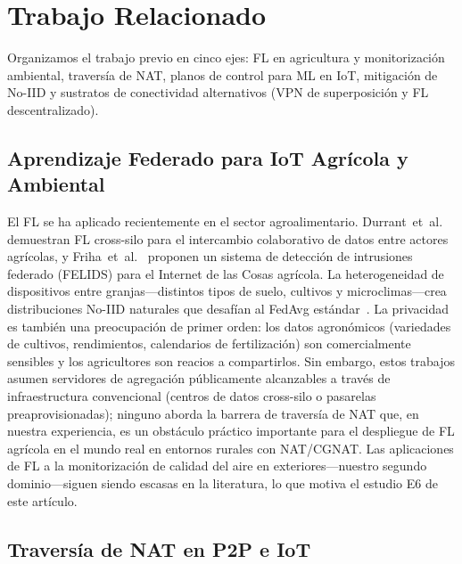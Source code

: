\documentclass[journal]{IEEEtran}
\begin{document}
\section{Trabajo Relacionado}
\label{sec:related}

Organizamos el trabajo previo en cinco ejes: FL en agricultura y monitorización ambiental, traversía de NAT, planos de control para ML en IoT, mitigación de No-IID y sustratos de conectividad alternativos (VPN de superposición y FL descentralizado).

\subsection{Aprendizaje Federado para IoT Agrícola y Ambiental}

El FL se ha aplicado recientemente en el sector agroalimentario. Durrant~et~al.~\cite{durrant2022} demuestran FL cross-silo para el intercambio colaborativo de datos entre actores agrícolas, y Friha~et~al.~\cite{friha2022} proponen un sistema de detección de intrusiones federado (FELIDS) para el Internet de las Cosas agrícola. La heterogeneidad de dispositivos entre granjas---distintos tipos de suelo, cultivos y microclimas---crea distribuciones No-IID naturales que desafían al FedAvg estándar~\cite{mcmahan2017}. La privacidad es también una preocupación de primer orden: los datos agronómicos (variedades de cultivos, rendimientos, calendarios de fertilización) son comercialmente sensibles y los agricultores son reacios a compartirlos. Sin embargo, estos trabajos asumen servidores de agregación públicamente alcanzables a través de infraestructura convencional (centros de datos cross-silo o pasarelas preaprovisionadas); ninguno aborda la barrera de traversía de NAT que, en nuestra experiencia, es un obstáculo práctico importante para el despliegue de FL agrícola en el mundo real en entornos rurales con NAT/CGNAT. Las aplicaciones de FL a la monitorización de calidad del aire en exteriores---nuestro segundo dominio---siguen siendo escasas en la literatura, lo que motiva el estudio E6 de este artículo.

\subsection{Traversía de NAT en P2P e IoT}
\end{document}

